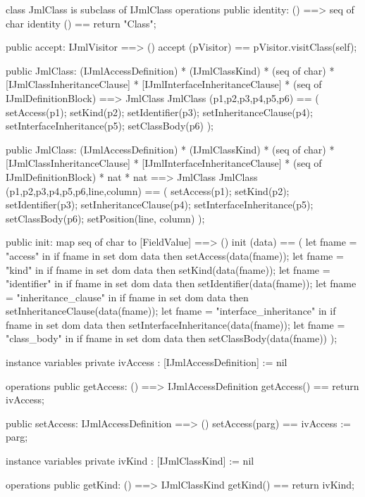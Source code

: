 \begin{vdm_al}
class JmlClass is subclass of IJmlClass
operations
  public identity: () ==> seq of char
  identity () == return "Class";

  public accept: IJmlVisitor ==> ()
  accept (pVisitor) == pVisitor.visitClass(self);

  public JmlClass:
    (IJmlAccessDefinition) *
    (IJmlClassKind) *
    (seq of char) *
    [IJmlClassInheritanceClause] *
    [IJmlInterfaceInheritanceClause] *
    (seq of IJmlDefinitionBlock) ==> JmlClass
  JmlClass (p1,p2,p3,p4,p5,p6) == 
    ( setAccess(p1);
      setKind(p2);
      setIdentifier(p3);
      setInheritanceClause(p4);
      setInterfaceInheritance(p5);
      setClassBody(p6) );

  public JmlClass:
    (IJmlAccessDefinition) *
    (IJmlClassKind) *
    (seq of char) *
    [IJmlClassInheritanceClause] *
    [IJmlInterfaceInheritanceClause] *
    (seq of IJmlDefinitionBlock) *
    nat *
    nat ==> JmlClass
  JmlClass (p1,p2,p3,p4,p5,p6,line,column) == 
    ( setAccess(p1);
      setKind(p2);
      setIdentifier(p3);
      setInheritanceClause(p4);
      setInterfaceInheritance(p5);
      setClassBody(p6);
      setPosition(line, column) );

  public init: map seq of char to [FieldValue] ==> ()
  init (data) ==
    ( let fname = "access" in
        if fname in set dom data
        then setAccess(data(fname));
      let fname = "kind" in
        if fname in set dom data
        then setKind(data(fname));
      let fname = "identifier" in
        if fname in set dom data
        then setIdentifier(data(fname));
      let fname = "inheritance_clause" in
        if fname in set dom data
        then setInheritanceClause(data(fname));
      let fname = "interface_inheritance" in
        if fname in set dom data
        then setInterfaceInheritance(data(fname));
      let fname = "class_body" in
        if fname in set dom data
        then setClassBody(data(fname)) );

instance variables
  private ivAccess : [IJmlAccessDefinition] := nil

operations
  public getAccess: () ==> IJmlAccessDefinition
  getAccess() == return ivAccess;

  public setAccess: IJmlAccessDefinition ==> ()
  setAccess(parg) == ivAccess := parg;

instance variables
  private ivKind : [IJmlClassKind] := nil

operations
  public getKind: () ==> IJmlClassKind
  getKind() == return ivKind;


\end{vdm_al}
